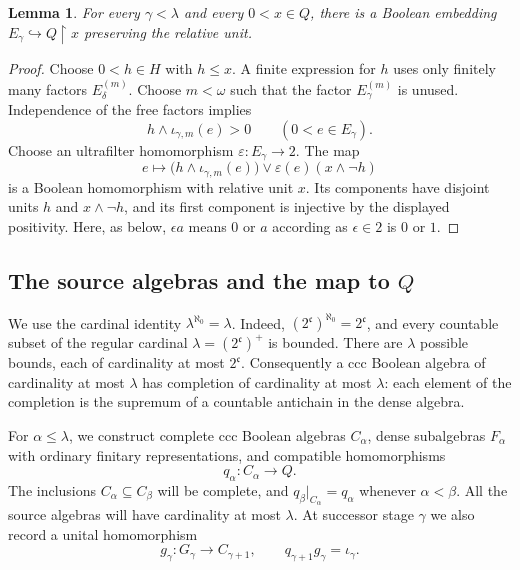 \documentclass[11pt]{article}
\newtheorem{lemma}[theorem]{Lemma}
\theoremstyle{definition}
\theoremstyle{remark}
\newcommand{\restr}{\mathbin{\upharpoonright}}
\newcommand{\cc}{\mathfrak c}
\begin{document}
\begin{lemma}\label{lem:universal-target-intervals}
For every $\gamma<\lambda$ and every $0<x\in Q$, there is a Boolean
embedding $E_\gamma\hookrightarrow Q\restr x$ preserving the
relative unit.
\end{lemma}

\begin{proof}
Choose $0<h\in H$ with $h\leq x$. A finite expression for $h$
uses only finitely many factors $E_\delta^{(m)}$. Choose $m<\omega$
such that the factor $E_\gamma^{(m)}$ is unused. Independence of the
free factors implies
\[
 h\wedge\iota_{\gamma,m}(e)>0
 \qquad(0<e\in E_\gamma).
\]
Choose an ultrafilter homomorphism $\varepsilon:E_\gamma\to2$.
The map
\[
 e\longmapsto
 \bigl(h\wedge\iota_{\gamma,m}(e)\bigr)
 \vee\varepsilon(e)(x\wedge\neg h)
\]
is a Boolean homomorphism with relative unit $x$. Its components have
disjoint units $h$ and $x\wedge\neg h$, and its first component is
injective by the displayed positivity. Here, as below,
$\epsilon a$ means $0$ or $a$ according as $\epsilon\in2$ is $0$ or $1$.
\end{proof}

\subsection{The source algebras and the map to \texorpdfstring{$Q$}{Q}}

We use the cardinal identity $\lambda^{\aleph_0}=\lambda$. Indeed,
$(2^\cc)^{\aleph_0}=2^\cc$, and every countable subset of the regular
cardinal $\lambda=(2^\cc)^+$ is bounded. There are $\lambda$ possible
bounds, each of cardinality at most $2^\cc$. Consequently a ccc Boolean
algebra of cardinality at most $\lambda$ has completion of cardinality
at most $\lambda$: each element of the completion is the supremum of a
countable antichain in the dense algebra.

For $\alpha\leq\lambda$, we construct complete ccc Boolean algebras
$C_\alpha$, dense subalgebras $F_\alpha$ with ordinary finitary
representations, and compatible homomorphisms
\[
 q_\alpha:C_\alpha\longrightarrow Q.
\]
The inclusions $C_\alpha\subseteq C_\beta$ will be complete, and
$q_\beta|_{C_\alpha}=q_\alpha$ whenever $\alpha<\beta$.
All the source algebras will have cardinality at most $\lambda$.
At successor stage $\gamma$ we also record a unital homomorphism
\begin{equation}\label{eq:recorded-lift}
 g_\gamma:G_\gamma\longrightarrow C_{\gamma+1},
 \qquad q_{\gamma+1}g_\gamma=\iota_\gamma.
\end{equation}
\end{document}
